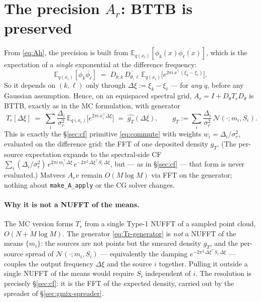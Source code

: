 \documentclass[11pt]{article}
\newcommand{\Eqx}{\mathbb{E}_{q(x_i)}}
\newcommand{\code}[1]{\texttt{\small #1}}
\begin{document}
\section{The precision $A_r$: BTTB is preserved}
\label{sec:Ar}

From \eqref{eq:Ah}, the precision is built from
$\Eqx[\phi_k(x)\overline{\phi_\ell(x)}]$, which is the expectation of a
\emph{single} exponential at the difference frequency:
\begin{equation}
\Eqx[\phi_k\overline{\phi_\ell}]
\;=\; D_{\theta,k}\,\overline{D_{\theta,\ell}}\,
\Eqx\!\big[e^{2\pi i\,x^\top(\xi_k-\xi_\ell)}\big].
\end{equation}
So it depends on $(k,\ell)$ only through $\Delta\xi:=\xi_k-\xi_\ell$ ---
for \emph{any} $q$, before any Gaussian assumption.  Hence, on an
equispaced spectral grid, $A_r = I + D_\theta T_r D_\theta$ is BTTB,
exactly as in the MC formulation, with generator
\begin{equation}
\boxed{\;
T_r[\Delta\xi]
\;=\;
\sum_i \frac{\Delta_i}{\sigma_r^2}\,
\Eqx\!\big[e^{2\pi i\,x_i^\top \Delta\xi}\big]
\;=\;
\widehat{g_T}(\Delta\xi),
\qquad
g_T := \sum_i \frac{\Delta_i}{\sigma_r^2}\,\mathcal{N}(\cdot;m_i,S_i).
\;}
\label{eq:Tr-generator}
\end{equation}
This is exactly the \S\ref{sec:cf} primitive \eqref{eq:commute} with
weights $w_i=\Delta_i/\sigma_r^2$, evaluated on the difference grid:
the FFT of one deposited density $g_T$.  (The per-source expectation
expands to the spectral-side CF $\sum_i (\Delta_i/\sigma_r^2)\,
e^{2\pi i\,m_i^\top\Delta\xi}\,e^{-2\pi^2\,\Delta\xi^\top S_i\,\Delta\xi}$,
but --- as in \S\ref{sec:cf} --- that form is never evaluated.)  Matvecs
$A_r v$ remain $O(M\log M)$ via FFT on the generator; nothing about
\code{make\_A\_apply} or the CG solver changes.

\paragraph{Why it is not a NUFFT of the means.}
The MC version forms $T_r$ from a single Type-1 NUFFT of a sampled
point cloud, $O(N + M\log M)$.  The generator \eqref{eq:Tr-generator}
is \emph{not} a NUFFT of the means $\{m_i\}$: the sources are not points
but the smeared density $g_T$, and the per-source spread of
$\mathcal{N}(\cdot;m_i,S_i)$ --- equivalently the damping
$e^{-2\pi^2\,\Delta\xi^\top S_i\,\Delta\xi}$ --- couples the output
frequency $\Delta\xi$ and the source $i$ together.  Pulling it outside a
single NUFFT of the means would require $S_i$ independent of $i$.  The
resolution is precisely \S\ref{sec:cf}: it is the FFT of the expected
density, carried out by the spreader of \S\ref{sec:gmix-spreader}.
\end{document}
